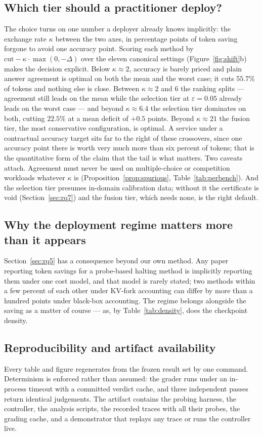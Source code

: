\documentclass[acmsmall]{acmart}
\theoremstyle{acmdefinition}%
\theoremstyle{acmplain}}{}%
\begin{document}
\subsection{Which tier should a practitioner deploy?}
The choice turns on one number a deployer already knows implicitly: the exchange rate $\kappa$ between the two axes, in percentage points of token saving forgone to avoid one accuracy point. Scoring each method by $\mathrm{cut} - \kappa\cdot\max(0,-\Delta)$ over the eleven canonical settings (Figure~\ref{fig:shift}b) makes the decision explicit. Below $\kappa \approx 2$, accuracy is barely priced and plain answer agreement is optimal on both the mean and the worst case; it cuts $55.7\%$ of tokens and nothing else is close. Between $\kappa \approx 2$ and $6$ the ranking splits --- agreement still leads on the mean while the selection tier at $\varepsilon=0.05$ already leads on the worst case --- and beyond $\kappa \approx 6.4$ the selection tier dominates on both, cutting $22.5\%$ at a mean deficit of $+0.5$ points. Beyond $\kappa \approx 21$ the fusion tier, the most conservative configuration, is optimal. A service under a contractual accuracy target sits far to the right of these crossovers, since one accuracy point there is worth very much more than six percent of tokens; that is the quantitative form of the claim that the tail is what matters. Two caveats attach. Agreement must never be used on multiple-choice or competition workloads whatever $\kappa$ is (Proposition~\ref{prop:spurious}, Table~\ref{tab:perbench}). And the selection tier presumes in-domain calibration data; without it the certificate is void (Section~\ref{sec:rq7}) and the fusion tier, which needs none, is the right default.

\subsection{Why the deployment regime matters more than it appears}
Section~\ref{sec:rq5} has a consequence beyond our own method. Any paper reporting token savings for a probe-based halting method is implicitly reporting them under one cost model, and that model is rarely stated; two methods within a few percent of each other under KV-fork accounting can differ by more than a hundred points under black-box accounting. The regime belongs alongside the saving as a matter of course --- as, by Table~\ref{tab:density}, does the checkpoint density.

\subsection{Reproducibility and artifact availability}
Every table and figure regenerates from the frozen result set by one command. Determinism is enforced rather than assumed: the grader runs under an in-process timeout with a committed verdict cache, and three independent passes return identical judgements. The artifact contains the probing harness, the controller, the analysis scripts, the recorded traces with all their probes, the grading cache, and a demonstrator that replays any trace or runs the controller live.
\end{document}
